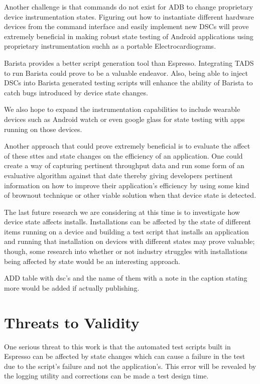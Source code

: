 Another challenge is that commands do not exist for ADB to change proprietary device instrumentation states.  Figuring out how to instantiate different hardware devices from the command interface and easily implement new DSCs will prove extremely beneficial in making robust state testing of Android applications using proprietary instrumentation suchh as a portable Electrocardiograms.  

Barista \cite{7927971} provides a better script generation tool than Espresso.  Integrating TADS to run Barista could prove to be a valuable endeavor.  Also, being able to inject DSCs into Barista generated testing scripts will enhance the ability of Barista to catch bugs introduced by device state changes.  

We also hope to expand the instrumentation capabilities to include wearable devices such as Android watch or even google glass for state testing with apps running on those devices.

Another approach that could prove extremely beneficial is to evaluate the affect of these sttes and state changes on the efficiency of an application. One could create a way of capturing pertinent throughput data and run some form of an evaluative algorithm against that date thereby giving developers pertinent information on how to improve their application's efficiency by using some kind of brownout technique \cite{Klein:2014:BBM:2568225.2568227} or other viable solution when that device state is detected. 

The last future research we are considering at this time is to investigate how device state affects installs.  Installations can be affected by the state of different items running on a device and building a test script that installs an application and running that installation on devices with different states may prove valuable; though, some research into whether or not industry struggles with installations being affected by state would be an interesting approach.  

ADD table with dsc's and the name of them with a note in the caption stating more would be added if actually publishing.  


\section{Threats to Validity}
One serious threat to this work is that the automated test scripts built in Espresso can be affected by state changes \cite{7927971} which can cause a failure in the test due to the script's failure and not the application's.  This error will be revealed by the logging utility and corrections can be made a test design time.  

